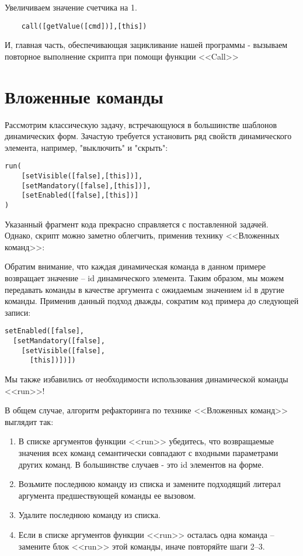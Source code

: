 \documentclass[../index.tex]{subfiles}
\begin{document}
    Увеличиваем значение счетчика на 1.
    
    \begin{verbatim}
    call([getValue([cmd])],[this])
    \end{verbatim}
    
    И, главная часть, обеспечивающая зацикливание нашей программы - вызываем повторное выполнение скрипта при помощи функции
    <<Call>>


\section{Вложенные команды}

Рассмотрим классическую задачу, встречающуюся в большинстве шаблонов динамических форм. Зачастую требуется установить ряд свойств динамического элемента, например, "выключить" и "скрыть":
\begin{verbatim}
run(
    [setVisible([false],[this])],
    [setMandatory([false],[this])],
    [setEnabled([false],[this])]
)
\end{verbatim}

Указанный фрагмент кода прекрасно справляется с поставленной задачей. Однако, скрипт можно заметно облегчить, применив технику <<Вложенных команд>>:

Обратим внимание, что каждая динамическая команда в данном примере возвращает значение -- id динамического элемента. Таким образом, мы можем передавать команды в качестве аргумента с ожидаемым значением id в другие команды. Применив данный подход
дважды, сократим код примера до следующей записи:

\begin{verbatim}
setEnabled([false],
  [setMandatory([false],
    [setVisible([false],
      [this])])])
\end{verbatim}

Мы также избавились от необходимости использования динамической команды <<run>>!

В общем случае, алгоритм рефакторинга по технике <<Вложенных команд>> выглядит так:

\begin{enumerate}
    \item В списке аргументов функции <<run>> убедитесь, что возвращаемые значения всех команд семантически совпадают с входными параметрами других команд. В большинстве случаев - это id элементов на форме.
    \item Возьмите последнюю команду из списка и замените подходящий литерал аргумента предшествующей команды ее вызовом.
    \item Удалите последнюю команду из списка.
    \item Если в списке аргументов функции <<run>> осталась одна команда -- замените блок <<run>> этой команды, иначе повторяйте шаги 2--3.
\end{enumerate}
\end{document}
